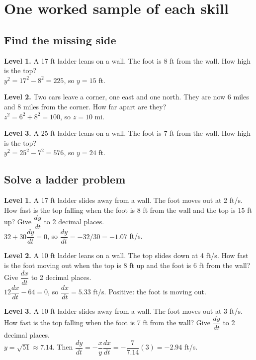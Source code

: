 \documentclass[11pt]{article}
\begin{document}
\section*{One worked sample of each skill}
\subsection*{Find the missing side}
\noindent\textbf{Level 1.} A 17 ft ladder leans on a wall. The foot is 8 ft from the wall. How high is the top?\\  \quad $y^2=17^2-8^2=225$, so $y=15$ ft.\par\medskip
\noindent\textbf{Level 2.} Two cars leave a corner, one east and one north. They are now 6 miles and 8 miles from the corner. How far apart are they?\\  \quad $z^2=6^2+8^2=100$, so $z=10$ mi.\par\medskip
\noindent\textbf{Level 3.} A 25 ft ladder leans on a wall. The foot is 7 ft from the wall. How high is the top?\\  \quad $y^2=25^2-7^2=576$, so $y=24$ ft.\par\medskip
\subsection*{Solve a ladder problem}
\noindent\textbf{Level 1.} A 17 ft ladder slides away from a wall. The foot moves out at 2 ft/s. How fast is the top falling when the foot is 8 ft from the wall and the top is 15 ft up? Give $\dfrac{dy}{dt}$ to 2 decimal places.\\  \quad $32+30\dfrac{dy}{dt}=0$, so $\dfrac{dy}{dt}=-32/30=-1.07$ ft/s.\par\medskip
\noindent\textbf{Level 2.} A 10 ft ladder leans on a wall. The top slides down at 4 ft/s. How fast is the foot moving out when the top is 8 ft up and the foot is 6 ft from the wall? Give $\dfrac{dx}{dt}$ to 2 decimal places.\\  \quad $12\dfrac{dx}{dt}-64=0$, so $\dfrac{dx}{dt}=5.33$ ft/s. Positive: the foot is moving out.\par\medskip
\noindent\textbf{Level 3.} A 10 ft ladder slides away from a wall. The foot moves out at 3 ft/s. How fast is the top falling when the foot is 7 ft from the wall? Give $\dfrac{dy}{dt}$ to 2 decimal places.\\  \quad $y=\sqrt{51}\approx7.14$. Then $\dfrac{dy}{dt}=-\dfrac{x}{y}\dfrac{dx}{dt}=-\dfrac{7}{7.14}(3)=-2.94$ ft/s.\par\medskip
\end{document}
